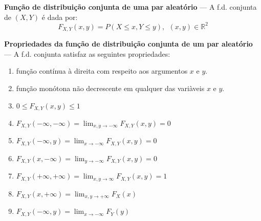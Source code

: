 \begin{mdframed}
    \noindent \textbf{Função de distribuição conjunta de uma par aleatório} --- A f.d. conjunta de $(X,Y)$ é dada por:
    $$
        F_{X,Y}(x,y) = P(X \leq x, Y \leq y),\,\; (x,y) \in \mathbb{R}^2
    $$

    \noindent\textbf{Propriedades da função de distribuição conjunta de um par aleatório} --- A f.d. conjunta satisfaz as seguintes propriedades:
    \begin{enumerate}[label=\textbf{\arabic*.}]
        \item função contínua à direita com respeito aos argumentos $x$ e $y$.
        \item função monótona não decrescente em qualquer das variàveis $x$ e $y$.
        \item $0 \leq F_{X,Y}(x,y) \leq 1$
        \item $F_{X,Y}(-\infty,-\infty) = \lim_{x,y \to -\infty} F_{X,Y}(x,y) = 0$
        \item[] $F_{X,Y}(-\infty,y) = \lim_{x \to -\infty} F_{X,Y}(x,y) = 0$
        \item[] $F_{X,Y}(x,-\infty) = \lim_{y \to -\infty} F_{X,Y}(x,y) = 0$
        \item[] $F_{X,Y}(+\infty,+\infty) = \lim_{x,y \to \infty} F_{X,Y}(x,y) = 1$
        \item $F_{X,Y}(x,+\infty) = \lim_{x,y \to +\infty} F_{X}(x)$
        \item[] $F_{X,Y}(-\infty,y) = \lim_{x \to -\infty} F_{Y}(y)$
    \end{enumerate}
\end{mdframed}

